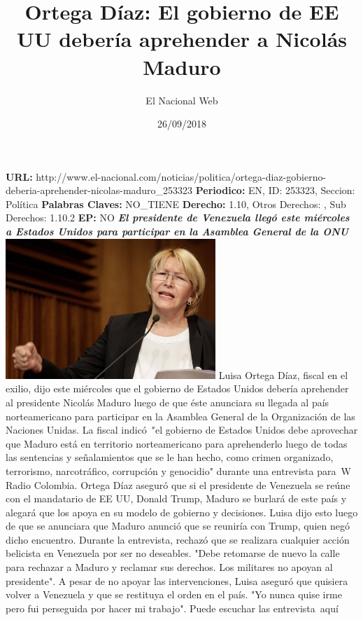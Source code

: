 \documentclass{article}%
\title{\textbf{Ortega Díaz: El gobierno de EE UU debería aprehender a Nicolás Maduro}}%
\author{El Nacional Web}%
\date{26/09/2018}%
\begin{document}
%
\normalsize%
\maketitle%
\textbf{URL: }%
http://www.el{-}nacional.com/noticias/politica/ortega{-}diaz{-}gobierno{-}deberia{-}aprehender{-}nicolas{-}maduro\_253323\newline%
%
\textbf{Periodico: }%
EN, %
ID: %
253323, %
Seccion: %
Política\newline%
%
\textbf{Palabras Claves: }%
NO\_TIENE\newline%
%
\textbf{Derecho: }%
1.10, %
Otros Derechos: %
, %
Sub Derechos: %
1.10.2\newline%
%
\textbf{EP: }%
NO\newline%
\newline%
%
\textbf{\textit{El presidente de Venezuela llegó este miércoles a Estados Unidos para participar en la Asamblea General de la ONU}}%
\newline%
\newline%
%
\includegraphics[width=300px]{257.jpg}%
\newline%
%
Luisa Ortega Díaz, fiscal en el exilio, dijo este miércoles que el gobierno de Estados Unidos debería aprehender al presidente Nicolás Maduro luego de que éste anunciara su llegada al país norteamericano para participar en la Asamblea General de la Organización de las Naciones Unidas.%
\newline%
%
La fiscal indicó~"el gobierno de Estados Unidos debe aprovechar que Maduro está en territorio norteamericano para aprehenderlo luego de todas las sentencias y señalamientos que se le han hecho, como crimen organizado, terrorismo, narcotráfico, corrupción y genocidio" durante una entrevista para~W Radio Colombia.%
\newline%
%
Ortega Díaz aseguró que si el presidente de Venezuela se reúne con el mandatario de EE UU, Donald Trump, Maduro se burlará de este país y alegará que los apoya en su modelo de gobierno y decisiones. Luisa dijo esto luego de que se anunciara que Maduro anunció que se reuniría con Trump, quien negó dicho encuentro.%
\newline%
%
Durante la entrevista, rechazó que se realizara cualquier acción belicista en Venezuela por ser no deseables. "Debe retomarse de nuevo la calle para rechazar a Maduro y reclamar sus derechos. Los militares no apoyan al presidente".%
\newline%
%
A pesar de no apoyar las intervenciones, Luisa aseguró que quisiera volver a Venezuela y que se restituya el orden en el país. "Yo nunca quise irme pero fui perseguida por hacer mi trabajo".%
\newline%
%
Puede escuchar las entrevista~aquí%
\newline%
%
\end{document}

